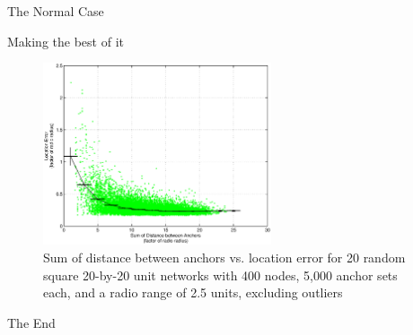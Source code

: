 \documentclass{beamer}
\begin{document}
\begin{frame}{The Normal Case}
\begin{block}{Making the best of it}
\begin{figure}
  \centering
	\includegraphics[width=0.6\textwidth]{SumOfDistanceIndicator_square}
	\caption[Sum of distance between anchors vs. location error]{Sum of distance between anchors vs. location error for 20 random square 20-by-20 unit networks with 400 nodes, 5,000 anchor sets each, and a radio range of 2.5 units, excluding outliers}
\end{figure}
\end{block}
\end{frame}

\begin{frame}
\centerline{The End}
\end{frame}
\end{document}
